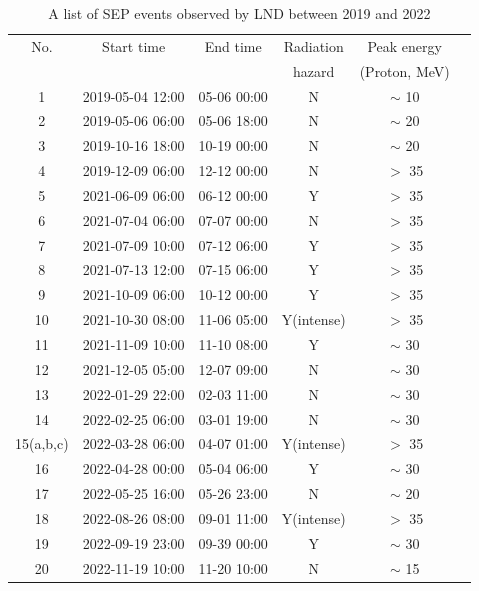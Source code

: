 \begin{table}[!tbhp]
    \centering
    \caption[\acs{LND} \acs{SEP} events lists]{A list of \ac{SEP} events observed by \ac{LND} between 2019 and 2022}
\begin{tabular}{cccccc}
    \hline
    No.     &  Start time    & End time      & Radiation  & Peak energy \\
            &                &               & hazard      & (Proton, MeV)\\
    \hline
    1       &   2019-05-04 12:00 & 05-06 00:00               & N  & $\sim$ 10\\
    2       &   2019-05-06 06:00 & 05-06 18:00              & N  & $\sim$ 20 \\
    3       &   2019-10-16 18:00 & 10-19 00:00             & N  & $\sim$ 20 \\
    4       &   2019-12-09 06:00 & 12-12 00:00             & N  & $>$ 35 \\    
    5       &   2021-06-09 06:00 & 06-12 00:00             & Y  & $>$ 35 \\
    6       &   2021-07-04 06:00 & 07-07 00:00             & N  & $>$ 35 \\
    7       &   2021-07-09 10:00 & 07-12 06:00             & Y  & $>$ 35 \\
    8       &   2021-07-13 12:00 & 07-15 06:00             & Y  & $>$ 35 \\
    9       &   2021-10-09 06:00 & 10-12 00:00             & Y  & $>$ 35 \\
    10      &   2021-10-30 08:00 & 11-06 05:00             & Y(intense)  & $>$ 35\\
    11      &   2021-11-09 10:00 & 11-10 08:00             & Y  & $\sim$ 30 \\
    12      &   2021-12-05 05:00 & 12-07 09:00             & N  & $\sim$ 30 \\
    13      &   2022-01-29 22:00 & 02-03 11:00             & N  & $\sim$ 30 \\
    14      &   2022-02-25 06:00 & 03-01 19:00             & N  & $\sim$ 30 \\
    15(a,b,c) & 2022-03-28 06:00 & 04-07 01:00             & Y(intense)  & $>$ 35 \\
    16      &    2022-04-28 00:00 & 05-04 06:00             & Y  & $\sim$ 30 \\
    17      &   2022-05-25 16:00 & 05-26 23:00             & N  & $\sim$ 20\\
    18      &   2022-08-26 08:00 & 09-01 11:00             & Y(intense)  & $>$ 35 \\
    19      &   2022-09-19 23:00 & 09-39 00:00             & Y  & $\sim$ 30 \\
    20      &   2022-11-19 10:00 & 11-20 10:00             & N  & $\sim$ 15 \\
    \hline
\end{tabular}
\label{Tab:appendix_LND_SEP_list}
\end{table}



